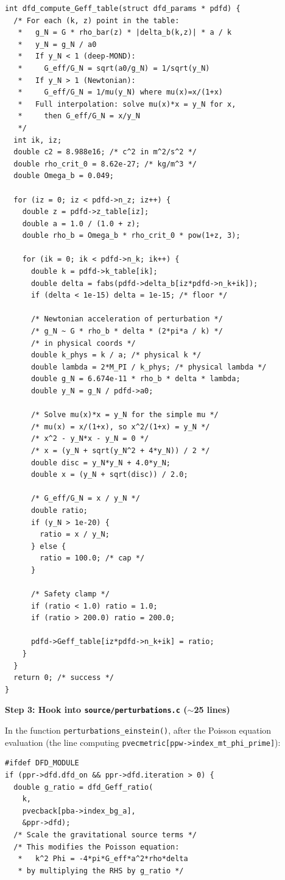 \documentclass[11pt]{article}
\theoremstyle{definition}
\theoremstyle{remark}
\begin{document}
\begin{tcolorbox}[colback=green!5!white, colframe=green!60!black,
  title=\textbf{NONLINEAR DFD CLASS: Complete Coding Specification}]
\begin{lstlisting}[caption={dfd\_nonlinear.c --- core implementation},numbers=none]
int dfd_compute_Geff_table(struct dfd_params * pdfd) {
  /* For each (k, z) point in the table:
   *   g_N = G * rho_bar(z) * |delta_b(k,z)| * a / k
   *   y_N = g_N / a0
   *   If y_N < 1 (deep-MOND):
   *     G_eff/G_N = sqrt(a0/g_N) = 1/sqrt(y_N)
   *   If y_N > 1 (Newtonian):
   *     G_eff/G_N = 1/mu(y_N) where mu(x)=x/(1+x)
   *   Full interpolation: solve mu(x)*x = y_N for x,
   *     then G_eff/G_N = x/y_N
   */
  int ik, iz;
  double c2 = 8.988e16; /* c^2 in m^2/s^2 */
  double rho_crit_0 = 8.62e-27; /* kg/m^3 */
  double Omega_b = 0.049;

  for (iz = 0; iz < pdfd->n_z; iz++) {
    double z = pdfd->z_table[iz];
    double a = 1.0 / (1.0 + z);
    double rho_b = Omega_b * rho_crit_0 * pow(1+z, 3);

    for (ik = 0; ik < pdfd->n_k; ik++) {
      double k = pdfd->k_table[ik];
      double delta = fabs(pdfd->delta_b[iz*pdfd->n_k+ik]);
      if (delta < 1e-15) delta = 1e-15; /* floor */

      /* Newtonian acceleration of perturbation */
      /* g_N ~ G * rho_b * delta * (2*pi*a / k) */
      /* in physical coords */
      double k_phys = k / a; /* physical k */
      double lambda = 2*M_PI / k_phys; /* physical lambda */
      double g_N = 6.674e-11 * rho_b * delta * lambda;
      double y_N = g_N / pdfd->a0;

      /* Solve mu(x)*x = y_N for the simple mu */
      /* mu(x) = x/(1+x), so x^2/(1+x) = y_N */
      /* x^2 - y_N*x - y_N = 0 */
      /* x = (y_N + sqrt(y_N^2 + 4*y_N)) / 2 */
      double disc = y_N*y_N + 4.0*y_N;
      double x = (y_N + sqrt(disc)) / 2.0;

      /* G_eff/G_N = x / y_N */
      double ratio;
      if (y_N > 1e-20) {
        ratio = x / y_N;
      } else {
        ratio = 100.0; /* cap */
      }

      /* Safety clamp */
      if (ratio < 1.0) ratio = 1.0;
      if (ratio > 200.0) ratio = 200.0;

      pdfd->Geff_table[iz*pdfd->n_k+ik] = ratio;
    }
  }
  return 0; /* success */
}
\end{lstlisting}

\textbf{Step 3: Hook into \texttt{source/perturbations.c}
($\sim$25 lines)}

In the function \texttt{perturbations\_einstein()}, after the Poisson
equation evaluation (the line computing
\texttt{pvecmetric[ppw->index\_mt\_phi\_prime]}):

\begin{lstlisting}[numbers=none]
#ifdef DFD_MODULE
if (ppr->dfd.dfd_on && ppr->dfd.iteration > 0) {
  double g_ratio = dfd_Geff_ratio(
    k,
    pvecback[pba->index_bg_a],
    &ppr->dfd);
  /* Scale the gravitational source terms */
  /* This modifies the Poisson equation:
   *   k^2 Phi = -4*pi*G_eff*a^2*rho*delta
   * by multiplying the RHS by g_ratio */


\end{lstlisting}
\end{tcolorbox}
\end{document}
